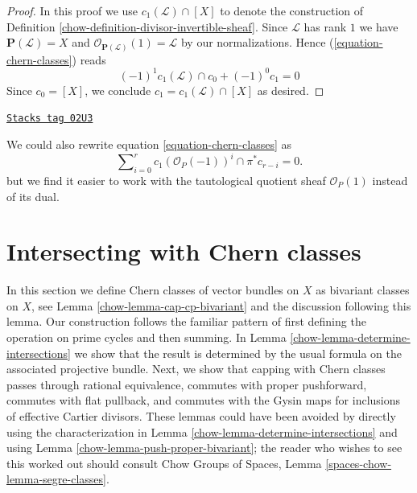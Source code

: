 \begin{proof}

In this proof we use $c_1(\mathcal{L}) \cap [X]$ to denote the
construction of Definition \ref{chow-definition-divisor-invertible-sheaf}.
Since $\mathcal{L}$ has rank $1$ we have
$\mathbf{P}(\mathcal{L}) = X$ and
$\mathcal{O}_{\mathbf{P}(\mathcal{L})}(1) = \mathcal{L}$
by our normalizations. Hence (\ref{equation-chern-classes})
reads
$$
(-1)^1 c_1(\mathcal{L}) \cap c_0 + (-1)^0 c_1 = 0
$$
Since $c_0 = [X]$, we conclude $c_1 = c_1(\mathcal{L}) \cap [X]$
as desired.
\end{proof}

\begin{remark}
\label{chow-remark-equation-signs}
\href{https://stacks.math.columbia.edu/tag/02U3}{\texttt{Stacks tag 02U3}}

We could also rewrite equation \ref{equation-chern-classes} as
\begin{equation}
\label{equation-signs}
\sum\nolimits_{i = 0}^r
c_1(\mathcal{O}_P(-1))^i \cap \pi^*c_{r - i}
= 0.
\end{equation}
but we find it easier to work with the tautological quotient
sheaf $\mathcal{O}_P(1)$ instead of
its dual.
\end{remark}

\section{Intersecting with Chern classes}
\label{chow-section-intersecting-chern-classes}
In this section we define Chern classes of vector bundles on $X$ as
bivariant classes on $X$, see Lemma \ref{chow-lemma-cap-cp-bivariant}
and the discussion following this lemma. Our construction follows the familiar
pattern of first defining the operation on prime cycles and then
summing. In Lemma \ref{chow-lemma-determine-intersections} we show
that the result is determined by the usual formula on the associated
projective bundle. Next, we show that capping with Chern classes
passes through rational equivalence, commutes with proper pushforward,
commutes with flat pullback, and commutes with the Gysin maps for
inclusions of effective Cartier divisors. These lemmas could have been
avoided by directly using the characterization in
Lemma \ref{chow-lemma-determine-intersections} and using
Lemma \ref{chow-lemma-push-proper-bivariant}; the reader who wishes to
see this worked out should consult
Chow Groups of Spaces, Lemma \ref{spaces-chow-lemma-segre-classes}.

